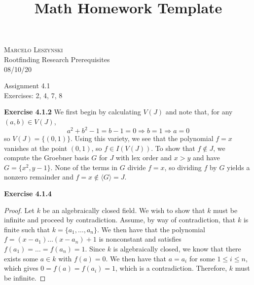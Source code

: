 \documentclass[12pt,oneside]{article}
\newenvironment{exercise}[1]{\vspace{.1in}\noindent\textbf{Exercise #1 \hspace{.05em}}}{}
\begin{document}
\title{Math Homework Template}

\begin{flushright}
\textsc{Marcelo Leszynski}  \\
Rootfinding Research Prerequisites\\
08/10/20
\end{flushright}

\begin{center}
\textsf{Assignment 4.1 } \\
\textsf{Exercises: 2, 4, 7, 8 }
\end{center}


\begin{exercise}{4.1.2}
    We first begin by calculating $V(J)$ and note that, for any $(a,b) \in V(J)$,
    \[
        a^2+b^2-1 = b-1 = 0 \Rightarrow b = 1 \Rightarrow a = 0
    \]
    so $V(J) = \{(0,1)\}$. Using this variety, we see that the polynomial $f=x$ vanishes 
    at the point $(0,1)$, so $f \in I(V(J))$. To show that $f \not \in J$, we compute the 
    Groebner basis $G$ for $J$ with lex order and $x > y$ and have $G = \{x^2,y-1\}$. None 
    of the terms in $G$ divide $f = x$, so dividing $f$ by $G$ yields a nonzero remainder and
    $f = x \not \in \langle G \rangle = J$.
\end{exercise}


\begin{exercise}{4.1.4}
    \begin{proof}
        Let $k$ be an algebraically closed field. We wish to show that $k$ must be infinite 
        and proceed by contradiction. Assume, by way of contradiction, that $k$ is finite 
        such that $k = \{a_1, \ldots, a_n\}$. We then have that the polynomial 
        $f = (x-a_1)\ldots(x-a_n) + 1$ is nonconstant and satisfies 
        $f(a_1) = \ldots = f(a_n) = 1$. Since $k$ is algebraically closed, we know that 
        there exists some $a \in k$ with $f(a) = 0$. We then have that $a = a_i$ for some 
        $1 \leq i \leq n$, which gives $0=f(a)=f(a_i)=1$, which is a contradiction. Therefore,
        $k$ must be infinite.
    \end{proof}
\end{exercise}

\end{document}
